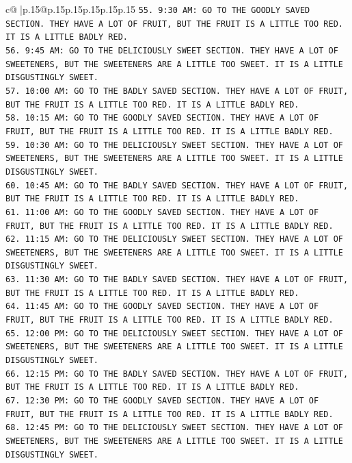 \documentclass{article}
\begin{document}
{\begin{supertabular}{c@{$\;$}|p{.15\linewidth}@{}p{.15\linewidth}p{.15\linewidth}p{.15\linewidth}p{.15\linewidth}p{.15\linewidth}}
{{{\texttt{55. 9:30 AM: GO TO THE GOODLY SAVED SECTION. THEY HAVE A LOT OF FRUIT, BUT THE FRUIT IS A LITTLE TOO RED. IT IS A LITTLE BADLY RED.} \\
\texttt{56. 9:45 AM: GO TO THE DELICIOUSLY SWEET SECTION. THEY HAVE A LOT OF SWEETENERS, BUT THE SWEETENERS ARE A LITTLE TOO SWEET. IT IS A LITTLE DISGUSTINGLY SWEET.} \\
\texttt{57. 10:00 AM: GO TO THE BADLY SAVED SECTION. THEY HAVE A LOT OF FRUIT, BUT THE FRUIT IS A LITTLE TOO RED. IT IS A LITTLE BADLY RED.} \\
\texttt{58. 10:15 AM: GO TO THE GOODLY SAVED SECTION. THEY HAVE A LOT OF FRUIT, BUT THE FRUIT IS A LITTLE TOO RED. IT IS A LITTLE BADLY RED.} \\
\texttt{59. 10:30 AM: GO TO THE DELICIOUSLY SWEET SECTION. THEY HAVE A LOT OF SWEETENERS, BUT THE SWEETENERS ARE A LITTLE TOO SWEET. IT IS A LITTLE DISGUSTINGLY SWEET.} \\
\texttt{60. 10:45 AM: GO TO THE BADLY SAVED SECTION. THEY HAVE A LOT OF FRUIT, BUT THE FRUIT IS A LITTLE TOO RED. IT IS A LITTLE BADLY RED.} \\
\texttt{61. 11:00 AM: GO TO THE GOODLY SAVED SECTION. THEY HAVE A LOT OF FRUIT, BUT THE FRUIT IS A LITTLE TOO RED. IT IS A LITTLE BADLY RED.} \\
\texttt{62. 11:15 AM: GO TO THE DELICIOUSLY SWEET SECTION. THEY HAVE A LOT OF SWEETENERS, BUT THE SWEETENERS ARE A LITTLE TOO SWEET. IT IS A LITTLE DISGUSTINGLY SWEET.} \\
\texttt{63. 11:30 AM: GO TO THE BADLY SAVED SECTION. THEY HAVE A LOT OF FRUIT, BUT THE FRUIT IS A LITTLE TOO RED. IT IS A LITTLE BADLY RED.} \\
\texttt{64. 11:45 AM: GO TO THE GOODLY SAVED SECTION. THEY HAVE A LOT OF FRUIT, BUT THE FRUIT IS A LITTLE TOO RED. IT IS A LITTLE BADLY RED.} \\
\texttt{65. 12:00 PM: GO TO THE DELICIOUSLY SWEET SECTION. THEY HAVE A LOT OF SWEETENERS, BUT THE SWEETENERS ARE A LITTLE TOO SWEET. IT IS A LITTLE DISGUSTINGLY SWEET.} \\
\texttt{66. 12:15 PM: GO TO THE BADLY SAVED SECTION. THEY HAVE A LOT OF FRUIT, BUT THE FRUIT IS A LITTLE TOO RED. IT IS A LITTLE BADLY RED.} \\
\texttt{67. 12:30 PM: GO TO THE GOODLY SAVED SECTION. THEY HAVE A LOT OF FRUIT, BUT THE FRUIT IS A LITTLE TOO RED. IT IS A LITTLE BADLY RED.} \\
\texttt{68. 12:45 PM: GO TO THE DELICIOUSLY SWEET SECTION. THEY HAVE A LOT OF SWEETENERS, BUT THE SWEETENERS ARE A LITTLE TOO SWEET. IT IS A LITTLE DISGUSTINGLY SWEET.} \\
}}}
\end{supertabular}}
\end{document}
